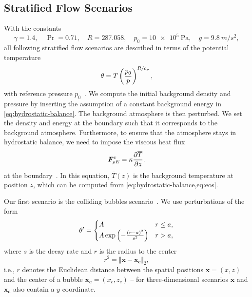 \documentclass[runningheads]{llncs}
\begin{document}
\subsection{Stratified Flow Scenarios}
With the constants
\begin{equation}\label{eq:atmosphere-constants}
    \gamma = 1.4 ,\quad \Pr =  0.71 ,\quad R = 287.058 ,\quad p_0 = \SI{10e5}{\Pa}, \quad g = \SI{9.8}{m/s^2},
\end{equation}
all following stratified flow scenarios are described in terms of the potential temperature
\begin{equation}
  \theta = T \left( \frac{p_0}{p} \right)^{R/c_p},
\end{equation}
with reference pressure $p_0$~\cite{muller2010adaptive,giraldo2008study}.
%
We compute the initial background density and pressure by inserting the assumption of a constant background energy in \cref{eq:hydrostatic-balance}.
The background atmosphere is then perturbed.
We set the density and energy at the boundary such that it corresponds to the background atmosphere.
Furthermore, to ensure that the atmosphere stays in hydrostatic balance, we need to impose the viscous heat flux
\begin{equation}
  \label{eq:atmosphere-bc}
  \viscFlux_{\QE} = \kappa \pdv{\overline{T}}{z}.%
\end{equation}
at the boundary~\cite{giraldo2008study}.
In this equation, $\overline{T}(z)$ is the background temperature at position $z$, which can be computed from \cref{eq:hydrostatic-balance,eq:eos}.

Our first scenario is the colliding bubbles scenario~\cite{muller2010adaptive}.
We use perturbations of the form
\begin{equation}
  \label{eq:bubbles-pertubation}
  \theta' =
  \begin{cases}
    A & r \leq a, \\
    A \exp \left( - \frac{(r-a)^2}{s^2} \right) & r > a,
    \end{cases}
\end{equation}
where $s$ is the decay rate and $r$  is the radius to the center
\begin{equation}
  \label{eq:radius}
  r^2 = \Vert \bm{x} - \bm{x_c} \Vert_2,
\end{equation}
i.e., $r$ denotes the Euclidean distance between the spatial positions $\bm{x} = (x, z)$ and the center of a bubble $\bm{x_c} = (x_c, z_c)$ -- for three-dimensional scenarios $\bm{x}$ and $\bm{x_c}$ also contain a $y$ coordinate.
\end{document}
